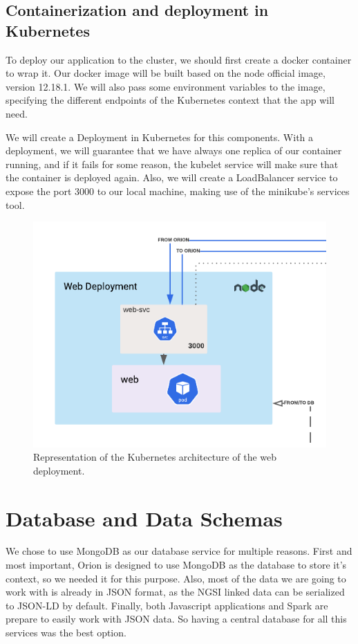 \subsection{Containerization and deployment in Kubernetes}

To deploy our application to the cluster, we should first create a docker container to wrap it. Our docker image will be built based on the node official image, version 12.18.1. We will also pass some environment variables to the image, specifying the different endpoints of the Kubernetes context that the app will need. 

We will create a Deployment in Kubernetes for this components. With a deployment, we will guarantee that we have always one replica of our container running, and if it fails for some reason, the kubelet service will make sure that the container is deployed again. Also, we will create a LoadBalancer service to expose the port 3000 to our local machine, making use of the minikube's services tool.

\begin{figure}[H]
	\centering
	\includegraphics[width=0.5\linewidth]{imagenes/diagram-web-kube.png}
	\caption{Representation of the Kubernetes architecture of the web deployment.}
	\label{diagram-web-kube}
\end{figure}

\clearpage

\section{Database and Data Schemas}
\label{section:DB}

We chose to use MongoDB as our database service for multiple reasons. First and most important, Orion is designed to use MongoDB as the database to store it's context, so we needed it for this purpose. Also, most of the data we are going to work with is already in JSON format, as the NGSI linked data can be serialized to JSON-LD by default. Finally, both Javascript applications and Spark are prepare to easily work with JSON data. So having a central database for all this services was the best option.

